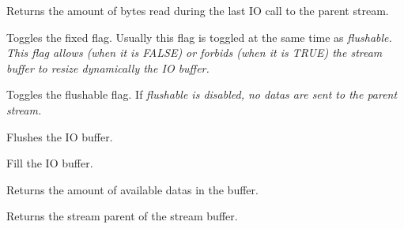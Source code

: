
Returns the amount of bytes read during the last IO call to the parent stream.



Toggles the fixed flag. Usually this flag is toggled at the same time as 
\it{flushable}. This flag allows (when it is FALSE) or forbids (when it is TRUE)
the stream buffer to resize dynamically the IO buffer.



Toggles the flushable flag. If \it{flushable} is disabled, no datas are sent
to the parent stream.



Flushes the IO buffer.



Fill the IO buffer.



Returns the amount of available datas in the buffer.



Returns the stream parent of the stream buffer.

